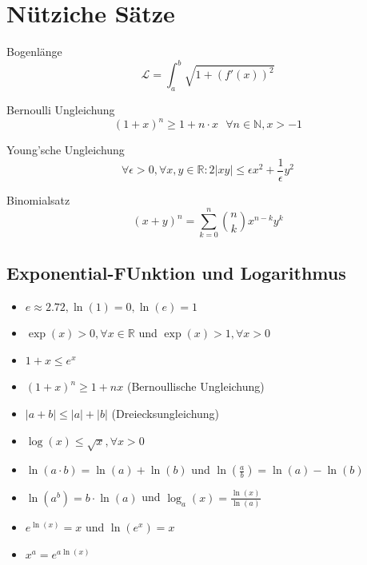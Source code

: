 \documentclass[a4paper,8pt]{extarticle}
\def\R{\mathbb{R}}
\begin{document}
\section{Nütziche Sätze}

\begin{subbox}{Bogenlänge}
  $$\mathcal{L} = \int_a^b \sqrt{1 + (f'(x))^2}$$ 
\end{subbox}

\begin{subbox}{Bernoulli Ungleichung}
  $$(1 + x)^n \geq 1 + n \cdot x \ \ \ \forall n \in \mathbb{N}, x > -1$$
\end{subbox}

\begin{subbox}{Young'sche Ungleichung}
  $$\forall \epsilon > 0, \forall x, y \in \R: 2|xy| \leq \epsilon x^2 + \frac{1}{\epsilon} y^2$$
\end{subbox}

\begin{subbox}{Binomialsatz}
  $$(x + y)^n = \sum_{k = 0}^n {n \choose k} x^{n-k}y^k$$
\end{subbox}
\subsection{Exponential-FUnktion und Logarithmus}
\begin{itemize}
  \item $e \approx 2.72, \ln (1)=0, \ln (e)=1$
  \item  $\exp (x)>0, \forall x \in \mathbb{R}$ und $\exp (x)>1, \forall x>0$
  \item $1+x \leq e^{x}$
  \item $(1+x)^{n} \geq 1+n x$ (Bernoullische Ungleichung)
  \item $|a+b| \leq|a|+|b|$ (Dreiecksungleichung)
  \item $\log (x) \leq \sqrt{x}, \forall x>0$
  \item $\ln (a \cdot b)=\ln (a)+\ln (b)$ und $\ln \left(\frac{a}{b}\right)=\ln (a)-\ln (b)$
  \item $\ln \left(a^{b}\right)=b \cdot \ln (a)$ und $\log _{a}(x)=\frac{\ln (x)}{\ln (a)}$
  \item $e^{\ln (x)}=x$ und $\ln \left(e^{x}\right)=x$
  \item $x^{a}=e^{a \ln (x)}$
\end{itemize}
\end{document}
